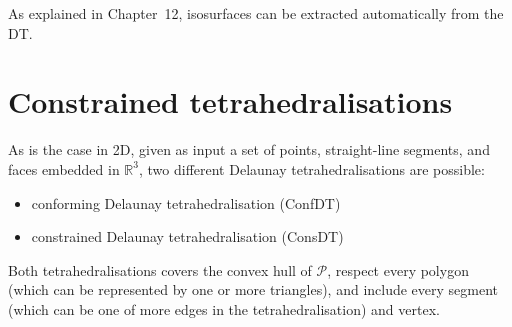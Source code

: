 As explained in Chapter~12, isosurfaces can be extracted automatically from the DT\@.



%
\section[Adding constraints]{Constrained tetrahedralisations}%
\label{sec:cdt}


As is the case in 2D, given as input a set of points, straight-line segments, and faces embedded in $\mathbb{R}^3$, two different Delaunay tetrahedralisations are possible:
\begin{itemize}
  \item conforming Delaunay tetrahedralisation (ConfDT)
  \item constrained Delaunay tetrahedralisation (ConsDT)
\end{itemize}
Both tetrahedralisations covers the convex hull of $\mathcal{P}$, respect every polygon (which can be represented by one or more triangles), and include every segment (which can be one of more edges in the tetrahedralisation) and vertex.

%

